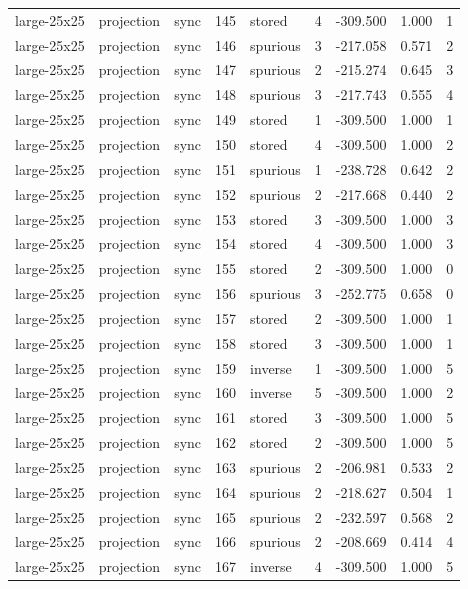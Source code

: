 \begin{tabular}{lllrlrrrr}
large-25x25 & projection & sync & 145 & stored & 4 & -309.500 & 1.000 & 1 \\
large-25x25 & projection & sync & 146 & spurious & 3 & -217.058 & 0.571 & 2 \\
large-25x25 & projection & sync & 147 & spurious & 2 & -215.274 & 0.645 & 3 \\
large-25x25 & projection & sync & 148 & spurious & 3 & -217.743 & 0.555 & 4 \\
large-25x25 & projection & sync & 149 & stored & 1 & -309.500 & 1.000 & 1 \\
large-25x25 & projection & sync & 150 & stored & 4 & -309.500 & 1.000 & 2 \\
large-25x25 & projection & sync & 151 & spurious & 1 & -238.728 & 0.642 & 2 \\
large-25x25 & projection & sync & 152 & spurious & 2 & -217.668 & 0.440 & 2 \\
large-25x25 & projection & sync & 153 & stored & 3 & -309.500 & 1.000 & 3 \\
large-25x25 & projection & sync & 154 & stored & 4 & -309.500 & 1.000 & 3 \\
large-25x25 & projection & sync & 155 & stored & 2 & -309.500 & 1.000 & 0 \\
large-25x25 & projection & sync & 156 & spurious & 3 & -252.775 & 0.658 & 0 \\
large-25x25 & projection & sync & 157 & stored & 2 & -309.500 & 1.000 & 1 \\
large-25x25 & projection & sync & 158 & stored & 3 & -309.500 & 1.000 & 1 \\
large-25x25 & projection & sync & 159 & inverse & 1 & -309.500 & 1.000 & 5 \\
large-25x25 & projection & sync & 160 & inverse & 5 & -309.500 & 1.000 & 2 \\
large-25x25 & projection & sync & 161 & stored & 3 & -309.500 & 1.000 & 5 \\
large-25x25 & projection & sync & 162 & stored & 2 & -309.500 & 1.000 & 5 \\
large-25x25 & projection & sync & 163 & spurious & 2 & -206.981 & 0.533 & 2 \\
large-25x25 & projection & sync & 164 & spurious & 2 & -218.627 & 0.504 & 1 \\
large-25x25 & projection & sync & 165 & spurious & 2 & -232.597 & 0.568 & 2 \\
large-25x25 & projection & sync & 166 & spurious & 2 & -208.669 & 0.414 & 4 \\
large-25x25 & projection & sync & 167 & inverse & 4 & -309.500 & 1.000 & 5 \\

\end{tabular}
